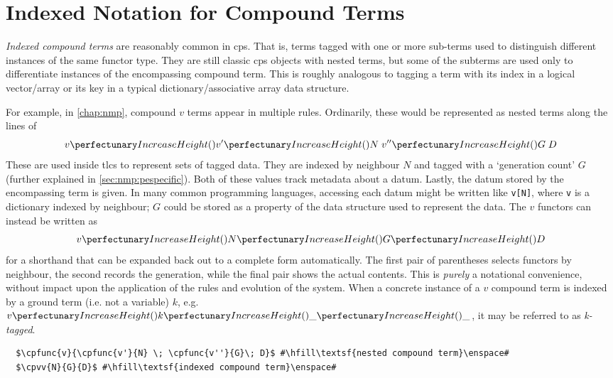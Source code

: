\section{\label{sec:cps:compoundterms}Indexed Notation for Compound Terms}

\emph{Indexed compound terms} are reasonably common in \gls{cps}.  That is, terms tagged with one or more sub-terms used to distinguish different instances of the same \gls{functor} type.  They are still classic \gls{cps} objects with nested terms, but some of the subterms are used only to differentiate instances of the encompassing compound term.  This is roughly analogous to tagging a term with its index in a logical vector/array or its key in a typical dictionary/associative array data structure.

For example, in \cref{chap:nmp}, compound \(v\) terms appear in multiple rules.  Ordinarily, these would be represented as nested terms along the lines of
\[ \cpfunc{v}{\cpfunc{v'}{N} \; \cpfunc{v''}{G}\; D} \]
These are used inside \glspl{tlc} to represent sets of tagged data.  They are indexed by neighbour \(N\) and tagged with a `generation count' \(G\) (further explained in \cref{sec:nmp:pespecific}).  Both of these values track metadata about a datum.  Lastly, the datum stored by the encompassing term is given.  In many common programming languages, accessing each datum might be written like \texttt{v[N]}, where \texttt{v} is a dictionary indexed by neighbour;  \(G\) could be stored as a property of the data structure used to represent the data.  The \(v\) \glspl{functor} can instead be written as \[ \cpvv{N}{G}{D} \] for a shorthand that can be expanded back out to a complete form automatically.  The first pair of parentheses selects \glspl{functor} by neighbour, the second records the generation, while the final pair shows the actual contents.  This is \emph{purely} a notational convenience, without impact upon the application of the rules and evolution of the system.  When a concrete instance of a \(v\) compound term is indexed by a ground term (i.e. not a variable) \(k\), e.g. \(\cpvv{k}{\_}{\_}\), it may be referred to as \emph{k-tagged}.

\lstset{xleftmargin=.5in, xrightmargin=.5in} 
\begin{lstlisting}
  $\cpfunc{v}{\cpfunc{v'}{N} \; \cpfunc{v''}{G}\; D}$ #\hfill\textsf{nested compound term}\enspace#
  $\cpvv{N}{G}{D}$ #\hfill\textsf{indexed compound term}\enspace#
\end{lstlisting}